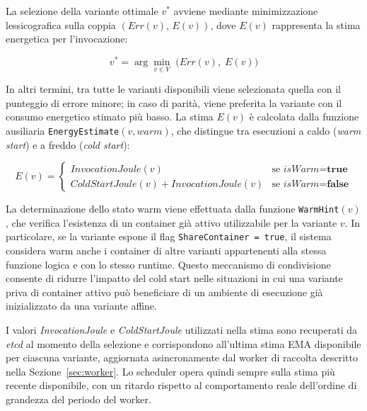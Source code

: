 La selezione della variante ottimale $v^*$ avviene mediante
minimizzazione lessicografica sulla coppia $(Err(v),\, E(v))$, dove $E(v)$
rappresenta la stima energetica per l'invocazione:

\begin{equation}
  v^* = \arg\min_{v \in V}\; \bigl(Err(v),\; E(v)\bigr)
  \label{eq:error_first}
\end{equation}

In altri termini, tra tutte le varianti disponibili viene selezionata
quella con il punteggio di errore minore; in caso di parità, viene
preferita la variante con il consumo energetico stimato più basso. La
stima $E(v)$ è calcolata dalla funzione ausiliaria
\texttt{EnergyEstimate}$(v, \textit{warm})$, che distingue tra esecuzioni
a caldo (\textit{warm start}) e a freddo (\textit{cold start}):

\begin{equation}
  E(v) =
  \begin{cases}
    \textit{InvocationJoule}(v) & \text{se } \textit{isWarm} = \textbf{true} \\
    \textit{ColdStartJoule}(v) + \textit{InvocationJoule}(v)
      & \text{se } \textit{isWarm} = \textbf{false}
  \end{cases}
  \label{eq:energy_estimate}
\end{equation}

La determinazione dello stato warm viene effettuata dalla funzione
\texttt{WarmHint}$(v)$, che verifica l'esistenza di un container già
attivo utilizzabile per la variante $v$. In particolare, se la variante
espone il flag \texttt{ShareContainer = true}, il sistema considera warm
anche i container di altre varianti appartenenti alla stessa funzione
logica e con lo stesso runtime. Questo meccanismo di condivisione consente di
ridurre l'impatto del cold start nelle situazioni in cui una variante
priva di container attivo può beneficiare di un ambiente di esecuzione già
inizializzato da una variante affine.

I valori \textit{InvocationJoule} e \textit{ColdStartJoule} utilizzati
nella stima sono recuperati da \textit{etcd} al momento della selezione e
corrispondono all'ultima stima EMA disponibile per ciascuna variante,
aggiornata asincronamente dal worker di raccolta descritto nella
Sezione~\ref{sec:worker}. Lo scheduler opera quindi sempre sulla stima più
recente disponibile, con un ritardo rispetto al comportamento reale
dell'ordine di grandezza del periodo del worker.



